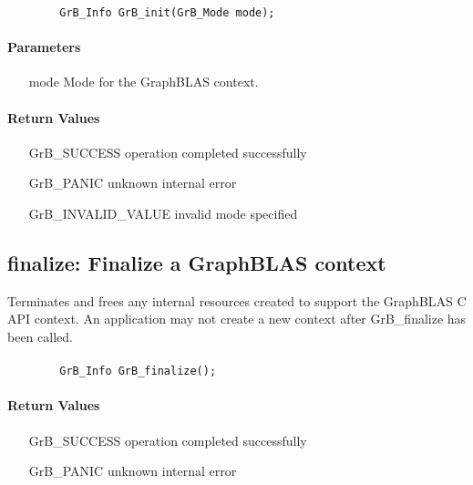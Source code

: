 \begin{verbatim}
        GrB_Info GrB_init(GrB_Mode mode);
\end{verbatim}


\paragraph{Parameters}

\begin{itemize}[leftmargin=1.1in]
	\item[{\sf mode}] Mode for the GraphBLAS context.
\end{itemize}

\paragraph{Return Values}


\begin{itemize}[leftmargin=2.1in]
\item[{\sf GrB\_SUCCESS}]           operation completed successfully
\item[{\sf GrB\_PANIC}]             unknown internal error  
\item[{\sf GrB\_INVALID\_VALUE}]    invalid mode specified
\end{itemize}


\subsection{{\sf finalize}: Finalize a GraphBLAS context}

Terminates and frees any internal resources created to 
support the GraphBLAS C API context.
An application may not create a new context after 
{\sf GrB\_finalize} has been called.

\paragraph{\syntax}

\begin{verbatim}
        GrB_Info GrB_finalize();
\end{verbatim}

\paragraph{Return Values}

\begin{itemize}[leftmargin=2.1in]
\item[{\sf GrB\_SUCCESS}]        operation completed successfully
\item[{\sf GrB\_PANIC}]          unknown internal error
\end{itemize}

